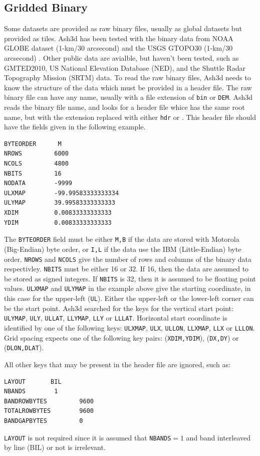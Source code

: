 \subsection{Gridded Binary}
Some datasets are provided as raw binary files, usually as global datasets but
provided as tiles. Ash3d has been tested with the binary data from NOAA GLOBE 
dataset (1-km/30 arcsecond) \cite{NOAAGLOBE} and the USGS GTOPO30 (1-km/30 arcsecond)
\cite{USGSGTOPO30}. Other public data are avialble, but haven't been tested, such as
GMTED2010, US National Elevation Database (NED), and the Shuttle Radar Topography
Mission (SRTM) data. To read the raw binary files, Ash3d needs to know the
structure of the data which must be provided in a header file. The raw binary
file can have any name, usually with a file extension of \texttt{bin} or
\texttt{DEM}. Ash3d reads the binary file name, and looks for a header file whice
has the same root name, but with the extension replaced with either \texttt{hdr}
or . This header file should have the fields given in the following
example.
\small
\begin{verbatim}
BYTEORDER      M
NROWS         6000
NCOLS         4800
NBITS         16
NODATA        -9999
ULXMAP        -99.99583333333334
ULYMAP        39.99583333333333
XDIM          0.00833333333333
YDIM          0.00833333333333
\end{verbatim}
\normalsize
The \texttt{BYTEORDER} field must be either \texttt{M,B} if the data are stored
with Motorola (Big-Endian) byte order, or \texttt{I,L} if the data use
the IBM (Little-Endian) byte order. \texttt{NROWS} and \texttt{NCOLS} give the
number of rows and columns of the binary data respectivley. \texttt{NBITS} must
be either 16 or 32. If 16, then the data are assumed to be stored as signed
integers. If \texttt{NBITS} is 32, then it is assumed to be floating point values.
\texttt{ULXMAP} and \texttt{ULYMAP} in the example above give the starting
coordinate, in this case for the upper-left (\texttt{UL}). Either the upper-left
or the lower-left corner can be the start point. Ash3d searched for the keys
for the vertical start point:
\texttt{ULYMAP}, \texttt{ULY}, \texttt{ULLAT}, \texttt{LLYMAP}, \texttt{LLY} or \texttt{LLLAT}.
Horizontal start coordinate is identified by one of the following keys:
\texttt{ULXMAP}, \texttt{ULX}, \texttt{ULLON}, \texttt{LLXMAP}, \texttt{LLX} or \texttt{LLLON}.
Grid spacing expects one of the following key pairs:
(\texttt{XDIM,YDIM}), (\texttt{DX,DY}) or (\texttt{DLON,DLAT}).

All other keys that may be present in the header file are ignored, such as:
\small
\begin{verbatim}
LAYOUT       BIL
NBANDS        1
BANDROWBYTES         9600
TOTALROWBYTES        9600
BANDGAPBYTES         0
\end{verbatim}
\normalsize
\texttt{LAYOUT} is not required since it
is assumed that \texttt{NBANDS}$=1$ and band interleaved by line (BIL) or not
is irrelevant.

